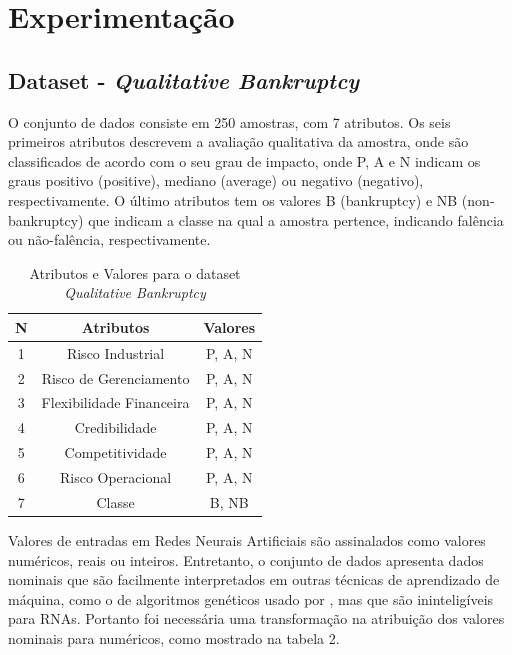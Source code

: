 \documentclass[12pt]{article}
\begin{document}
\section{Experimentação}
	\subsection{Dataset - \textit{Qualitative Bankruptcy}}
	O conjunto de dados consiste em 250 amostras, com 7 atributos. Os seis primeiros atributos descrevem a avaliação qualitativa da amostra, onde são classificados de acordo com o seu grau de impacto, onde P, A e N indicam os graus positivo (positive), mediano (average) ou negativo (negativo), respectivamente. O último atributos tem os valores B (bankruptcy) e NB (non-bankruptcy) que indicam a classe na qual a amostra pertence, indicando falência ou não-falência, respectivamente.
	\begin{table}[H]
	\centering
	\caption{Atributos e Valores para o dataset \textit{Qualitative Bankruptcy}}
	\label{tab:exTable1}
	\begin{tabular}{ccc}
	\hline
	N & Atributos             & Valores       \\ \hline
	1 & Risco Industrial       & P, A, N \\
	2 & Risco de Gerenciamento       & P, A, N \\
	3 & Flexibilidade Financeira & P, A, N \\
	4 & Credibilidade           & P, A, N \\
	5 & Competitividade       & P, A, N \\
	6 & Risco Operacional        & P, A, N \\
	7 & Classe                 & B, NB   \\ \hline
	\end{tabular}
	\end{table}
	Valores de entradas em Redes Neurais Artificiais são assinalados como valores numéricos, reais ou inteiros. Entretanto, o conjunto de dados apresenta dados nominais que são facilmente interpretados em outras técnicas de aprendizado de máquina, como o de algoritmos genéticos usado por \cite{myoung:03}, mas que são ininteligíveis para RNAs. Portanto foi necessária uma transformação na atribuição dos valores nominais para numéricos, como mostrado na tabela 2.
\end{document}
